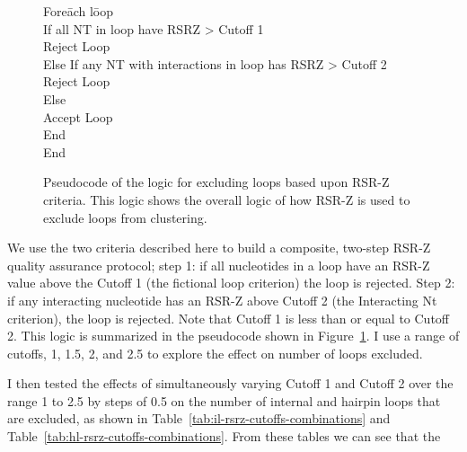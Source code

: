 \begin{figure}
  \begin{tabbing}
  Fore\=ach l\=oop \\
    \>If all NT in loop have RSRZ \textgreater{} Cutoff 1 \\
      \>\>Reject Loop \\
    \>Else If any NT with interactions in loop has RSRZ \textgreater{} Cutoff 2 \\
      \>\>Reject Loop \\
    \>Else \\
      \>\>Accept Loop \\
    \>End \\
  End
  \end{tabbing}
  \caption{Pseudocode of the logic for excluding loops based upon RSR-Z
  criteria. This logic shows the overall logic of how RSR-Z is used to exclude
  loops from clustering.}
\label{fig:pseudo-rsrz-logic}
\end{figure}

We use the two criteria described here to build a composite, two-step RSR-Z
quality assurance protocol; step 1: if all nucleotides in a loop have an RSR-Z
value above the Cutoff 1 (the fictional loop criterion) the loop is rejected.
Step 2: if any interacting nucleotide has an RSR-Z above Cutoff 2 (the
Interacting Nt criterion), the loop is rejected. Note that Cutoff 1 is less than
or equal to Cutoff 2. This logic is summarized in the pseudocode shown in
Figure~\ref{fig:pseudo-rsrz-logic}. I use a range of cutoffs, 1, 1.5, 2, and 2.5
to explore the effect on number of loops excluded. 

I then tested the effects of simultaneously varying Cutoff 1 and Cutoff 2 over
the range 1 to 2.5 by steps of 0.5 on the number of internal and hairpin loops
that are excluded, as shown in Table~\ref{tab:il-rsrz-cutoffs-combinations} and
Table~\ref{tab:hl-rsrz-cutoffs-combinations}. From these tables we can see that
the

